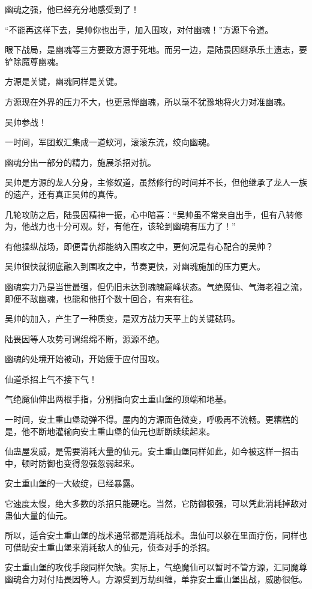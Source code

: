 \begin{this_body}
幽魂之强，他已经充分地感受到了！

“不能再这样下去，吴帅你也出手，加入围攻，对付幽魂！”方源下令道。

眼下战局，是幽魂等三方要致方源于死地。而另一边，是陆畏因继承乐土遗志，要铲除魔尊幽魂。

方源是关键，幽魂同样是关键。

方源现在外界的压力不大，也更忌惮幽魂，所以毫不犹豫地将火力对准幽魂。

吴帅参战！

一时间，军团蚁汇集成一道蚁河，滚滚东流，绞向幽魂。

幽魂分出一部分的精力，施展杀招对抗。

吴帅是方源的龙人分身，主修奴道，虽然修行的时间并不长，但他继承了龙人一族的遗产，还有真正吴帅的真传。

几轮攻防之后，陆畏因精神一振，心中暗喜：“吴帅虽不常亲自出手，但有八转修为，他战力也十分可观。好，有他在，该轮到幽魂有压力了！”

有他操纵战场，即便青仇都能纳入围攻之中，更何况是有心配合的吴帅？

吴帅很快就彻底融入到围攻之中，节奏更快，对幽魂施加的压力更大。

幽魂实力乃是当世最强，但仍旧未达到魂魄巅峰状态。气绝魔仙、气海老祖之流，即便不敌幽魂，也能和他打个数十回合，有来有往。

吴帅的加入，产生了一种质变，是双方战力天平上的关键砝码。

陆畏因等人攻势可谓绵绵不断，源源不绝。

幽魂的处境开始被动，开始疲于应付围攻。

仙道杀招上气不接下气！

气绝魔仙伸出两根手指，分别指向安土重山堡的顶端和地基。

一时间，安土重山堡动弹不得。屋内的方源面色微变，呼吸再不流畅。更糟糕的是，他不断地灌输向安土重山堡的仙元也断断续续起来。

仙蛊屋发威，是需要消耗大量的仙元。安土重山堡同样如此，如今被这样一招击中，顿时防御也变得忽强忽弱起来。

安土重山堡的一大破绽，已经暴露。

它速度太慢，绝大多数的杀招只能硬吃。当然，它防御极强，可以凭此消耗掉敌对蛊仙大量的仙元。

所以，适合安土重山堡的战术通常都是消耗战术。蛊仙可以躲在里面疗伤，同样也可借助安土重山堡来消耗敌人的仙元，侦查对手的杀招。

安土重山堡的攻伐手段同样欠缺。实际上，气绝魔仙可以暂时不管方源，汇同魔尊幽魂合力对付陆畏因等人。方源受到万劫纠缠，单靠安土重山堡出战，威胁很低。


\end{this_body}
